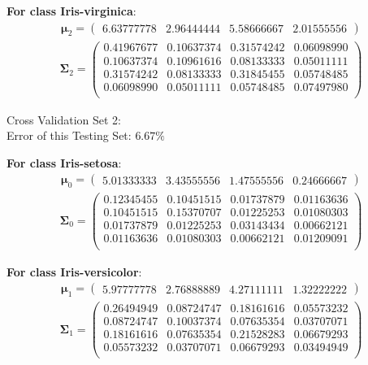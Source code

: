 \documentclass[11pt,a4paper]{article}
\newcommand{\htab}{\hspace*{0.63cm}}
\newcommand{\bs}[1]{\boldsymbol{#1}}
\begin{document}
\textbf{For class Iris-virginica}:
\begin{align} \bs{\mu}_{2} = \begin{pmatrix} 
6.63777778 & 2.96444444 & 5.58666667 & 2.01555556 
 \end{pmatrix}  \end{align} 
\vspace{-1cm}
\begin{align} \bs{\Sigma}_{2} = \begin{pmatrix} 
0.41967677 & 0.10637374 & 0.31574242 & 0.06098990 \\ 
0.10637374 & 0.10961616 & 0.08133333 & 0.05011111 \\ 
0.31574242 & 0.08133333 & 0.31845455 & 0.05748485 \\ 
0.06098990 & 0.05011111 & 0.05748485 & 0.07497980 \\ 
\end{pmatrix} \end{align}


Cross Validation Set 2: \\
\htab Error of this Testing Set: $6.67\%$ 

\textbf{For class Iris-setosa}:
\begin{align} \bs{\mu}_{0} = \begin{pmatrix} 
5.01333333 & 3.43555556 & 1.47555556 & 0.24666667 
 \end{pmatrix}  \end{align} 
\vspace{-1cm}
\begin{align} \bs{\Sigma}_{0} = \begin{pmatrix} 
0.12345455 & 0.10451515 & 0.01737879 & 0.01163636 \\ 
0.10451515 & 0.15370707 & 0.01225253 & 0.01080303 \\ 
0.01737879 & 0.01225253 & 0.03143434 & 0.00662121 \\ 
0.01163636 & 0.01080303 & 0.00662121 & 0.01209091 \\ 
\end{pmatrix} \end{align}

\textbf{For class Iris-versicolor}:
\begin{align} \bs{\mu}_{1} = \begin{pmatrix} 
5.97777778 & 2.76888889 & 4.27111111 & 1.32222222 
 \end{pmatrix}  \end{align} 
\vspace{-1cm}
\begin{align} \bs{\Sigma}_{1} = \begin{pmatrix} 
0.26494949 & 0.08724747 & 0.18161616 & 0.05573232 \\ 
0.08724747 & 0.10037374 & 0.07635354 & 0.03707071 \\ 
0.18161616 & 0.07635354 & 0.21528283 & 0.06679293 \\ 
0.05573232 & 0.03707071 & 0.06679293 & 0.03494949 \\ 
\end{pmatrix} \end{align}
\end{document}
